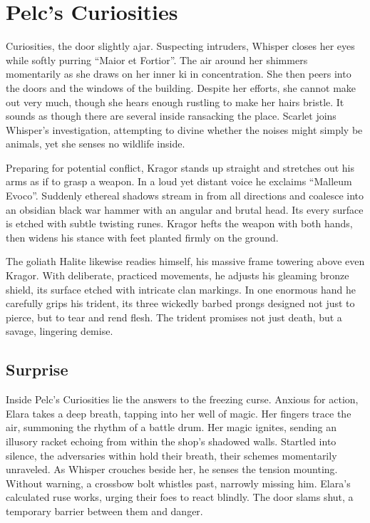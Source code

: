 \documentclass[
  12pt,twoside,twocolumn,openany,nodeprecatedcode]{dndbook}
\begin{document}
\chapter{Pelc's Curiosities}\label{pelcs-curiosities}

 Curiosities, the door
slightly ajar. Suspecting intruders, Whisper closes her eyes while
softly purring ``Maior et Fortior''. The air around her shimmers
momentarily as she draws on her inner ki in concentration. She then
peers into the doors and the windows of the building. Despite her
efforts, she cannot make out very much, though she hears enough rustling
to make her hairs bristle. It sounds as though there are several inside
ransacking the place. Scarlet joins Whisper's investigation, attempting
to divine whether the noises might simply be animals, yet she senses no
wildlife inside.

Preparing for potential conflict, Kragor stands up straight and
stretches out his arms as if to grasp a weapon. In a loud yet distant
voice he exclaims ``Malleum Evoco''. Suddenly ethereal shadows stream in
from all directions and coalesce into an obsidian black war hammer with
an angular and brutal head. Its every surface is etched with subtle
twisting runes. Kragor hefts the weapon with both hands, then widens his
stance with feet planted firmly on the ground.

The goliath Halite likewise readies himself, his massive frame towering
above even Kragor. With deliberate, practiced movements, he adjusts his
gleaming bronze shield, its surface etched with intricate clan markings.
In one enormous hand he carefully grips his trident, its three wickedly
barbed prongs designed not just to pierce, but to tear and rend flesh.
The trident promises not just death, but a savage, lingering demise.

\section{Surprise}\label{surprise}

Inside Pelc's Curiosities lie the answers to the freezing curse. Anxious
for action, Elara takes a deep breath, tapping into her well of magic.
Her fingers trace the air, summoning the rhythm of a battle drum. Her
magic ignites, sending an illusory racket echoing from within the shop's
shadowed walls. Startled into silence, the adversaries within hold their
breath, their schemes momentarily unraveled. As Whisper crouches beside
her, he senses the tension mounting. Without warning, a crossbow bolt
whistles past, narrowly missing him. Elara's calculated ruse works,
urging their foes to react blindly. The door slams shut, a temporary
barrier between them and danger.
\end{document}
